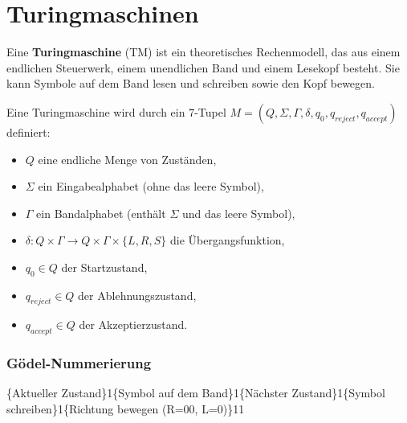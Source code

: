 \documentclass{article}
\begin{document}
\begin{minipage}[t]{0.45\textwidth}
\end{minipage}
\section*{Turingmaschinen}
\begin{minipage}[t]{0.45\textwidth}
    Eine \textbf{Turingmaschine} (TM) ist ein theoretisches Rechenmodell, das aus einem endlichen Steuerwerk, einem unendlichen Band und einem Lesekopf besteht. Sie kann Symbole auf dem Band lesen und schreiben sowie den Kopf bewegen.
    
    Eine Turingmaschine wird durch ein 7-Tupel $M = (Q, \Sigma, \Gamma, \delta, q_0, q_{reject}, q_{accept})$ definiert:
    \begin{itemize}
        \item $Q$ eine endliche Menge von Zuständen,
        \item $\Sigma$ ein Eingabealphabet (ohne das leere Symbol),
        \item $\Gamma$ ein Bandalphabet (enthält $\Sigma$ und das leere Symbol),
        \item $\delta: Q \times \Gamma \to Q \times \Gamma \times \{L, R, S\}$ die Übergangsfunktion,
        \item $q_0 \in Q$ der Startzustand,
        \item $q_{reject} \in Q$ der Ablehnungszustand,
        \item $q_{accept} \in Q$ der Akzeptierzustand.
    \end{itemize}

    \subsubsection*{Gödel-Nummerierung}
    \{Aktueller Zustand\}1\{Symbol auf dem Band\}1\{Nächster Zustand\}1\{Symbol schreiben\}1\{Richtung bewegen (R=00, L=0)\}11
\end{minipage}
\end{document}
